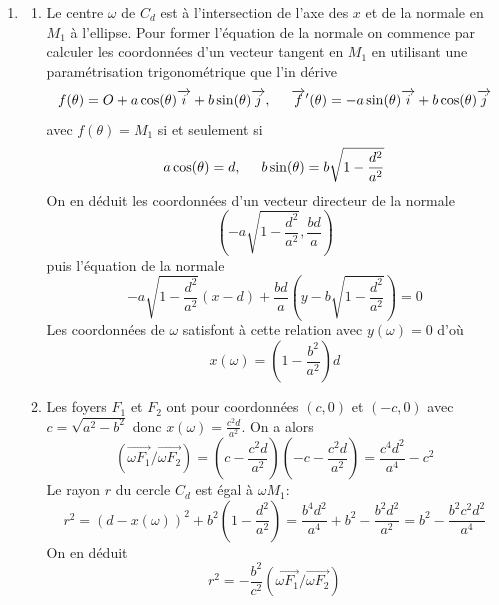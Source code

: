 \begin{enumerate}
 \item
\begin{enumerate}
 \item Le centre $\omega$ de $C_d$ est à l'intersection de l'axe des $x$ et de la normale en $M_1$ à l'ellipse. Pour former l'équation de la normale on commence par calculer les coordonnées d'un vecteur tangent en $M_1$ en utilisant une paramétrisation trigonométrique que l'in dérive
\begin{displaymath}
 f(\theta)= O + a\cos(\theta)\overrightarrow i + b\sin(\theta) \overrightarrow j,\hspace{0.5cm}
\overrightarrow f'(\theta) = -a\sin(\theta)\overrightarrow i + b\cos(\theta) \overrightarrow j
\end{displaymath}
avec $f(\theta)=M_1$ si et seulement si 
\begin{displaymath}
 a\cos(\theta) = d, \hspace{0.5cm}
b\sin (\theta) = b\sqrt{1-\frac{d^2}{a^2}}
\end{displaymath}
On en déduit les coordonnées d'un vecteur directeur de la normale
\begin{displaymath}
 \left( -a\sqrt{1-\frac{d^2}{a^2}}, \frac{bd}{a}\right) 
\end{displaymath}
puis l'équation de la normale
\begin{displaymath}
 -a\sqrt{1-\frac{d^2}{a^2}}(x-d)+\frac{bd}{a}(y-b\sqrt{1-\frac{d^2}{a^2}})=0
\end{displaymath}
Les coordonnées de $\omega$ satisfont à cette relation avec $y(\omega)=0$ d'où
\begin{displaymath}
 x(\omega) = (1-\frac{b^2}{a^2})d
\end{displaymath}

 \item Les foyers $F_1$ et $F_2$ ont pour coordonnées $(c,0)$ et $(-c,0)$ avec $c=\sqrt{a^2-b^2}$ donc $x(\omega)=\frac{c^2d}{a^2}$. On a alors
\begin{displaymath}
 (\overrightarrow{\omega F_1} / \overrightarrow{\omega F_2})=
(c-\frac{c^2d}{a^2})(-c-\frac{c^2d}{a^2}) = \frac{c^4d^2}{a^4} - c^2
\end{displaymath}
Le rayon $r$ du cercle $C_d$ est égal à $\omega M_1$:
\begin{displaymath}
 r^2=(d-x(\omega))^2+b^2(1-\frac{d^2}{a^2})
=\frac{b^4d^2}{a^4}+b^2-\frac{b^2d^2}{a^2}
=b^2-\frac{b^2c^2d^2}{a^4}
\end{displaymath}
On en déduit
\begin{displaymath}
 r^2 = -\frac{b^2}{c^2}(\overrightarrow{\omega F_1} / \overrightarrow{\omega F_2})
\end{displaymath}


\end{enumerate}
\end{enumerate}
